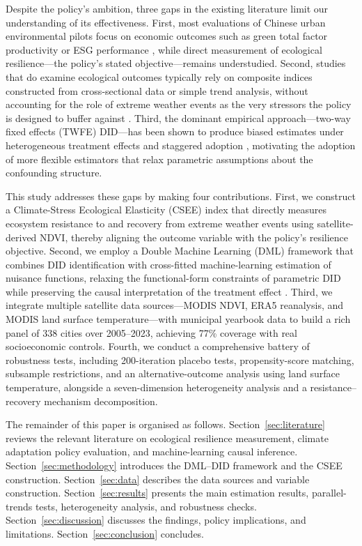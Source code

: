 Despite the policy's ambition, three gaps in the existing literature
limit our understanding of its effectiveness. First, most evaluations
of Chinese urban environmental pilots focus on economic outcomes such
as green total factor productivity or ESG performance
\citep{yuan2024double,qian2025impact}, while direct measurement of
ecological resilience---the policy's stated objective---remains
understudied. Second, studies that do examine ecological outcomes
typically rely on composite indices constructed from cross-sectional
data or simple trend analysis, without accounting for the role of
extreme weather events as the very stressors the policy is designed to
buffer against \citep{gong2025beyond,hasan2025analyzing}. Third, the
dominant empirical approach---two-way fixed effects (TWFE) DID---has
been shown to produce biased estimates under heterogeneous treatment
effects and staggered adoption \citep{borusyak2024revisiting,
wooldridge2025twoway}, motivating the adoption of more flexible
estimators that relax parametric assumptions about the
confounding structure.

This study addresses these gaps by making four contributions. First,
we construct a Climate-Stress Ecological Elasticity (CSEE) index that
directly measures ecosystem resistance to and recovery from extreme
weather events using satellite-derived NDVI, thereby aligning the
outcome variable with the policy's resilience objective. Second, we
employ a Double Machine Learning (DML) framework
\citep{chernozhukov2022automatic} that combines DID identification
with cross-fitted machine-learning estimation of nuisance functions,
relaxing the functional-form constraints of parametric DID while
preserving the causal interpretation of the treatment effect
\citep{ahrens2024ddml}. Third, we integrate multiple satellite data
sources---MODIS NDVI, ERA5 reanalysis, and MODIS land surface
temperature---with municipal yearbook data to build a rich panel of
338 cities over 2005--2023, achieving 77\% coverage with real
socioeconomic controls. Fourth, we conduct a comprehensive battery of
robustness tests, including 200-iteration placebo tests, propensity-score
matching, subsample restrictions, and an alternative-outcome analysis
using land surface temperature, alongside a seven-dimension
heterogeneity analysis and a resistance--recovery mechanism
decomposition.

The remainder of this paper is organised as follows.
Section~\ref{sec:literature} reviews the relevant literature on
ecological resilience measurement, climate adaptation policy
evaluation, and machine-learning causal inference.
Section~\ref{sec:methodology} introduces the DML--DID framework and
the CSEE construction. Section~\ref{sec:data} describes the data
sources and variable construction. Section~\ref{sec:results} presents
the main estimation results, parallel-trends tests, heterogeneity
analysis, and robustness checks. Section~\ref{sec:discussion} discusses
the findings, policy implications, and limitations.
Section~\ref{sec:conclusion} concludes.
